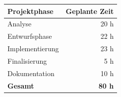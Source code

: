 \begin{tabular}{lr}
\rowcolor{heading}\textbf{Projektphase} & \textbf{Geplante Zeit} \\
\hline
Analyse & 20 h \\
\rowcolor{odd}Entwurfsphase & 22 h \\
Implementierung & 23 h \\
\rowcolor{odd}Finalisierung & 5 h \\
Dokumentation & 10 h \\
\hline
\hline
\rowcolor{odd}\textbf{Gesamt} & \textbf{80 h} \\
\end{tabular}